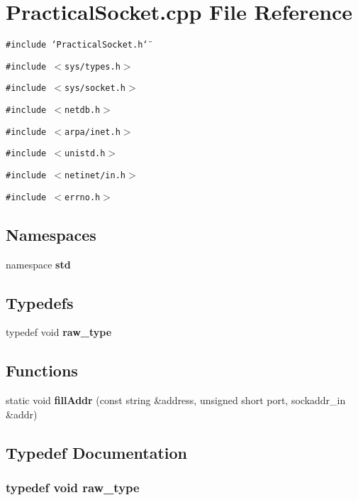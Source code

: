 \section{Practical\-Socket.cpp File Reference}
\label{PracticalSocket_8cpp}
{\tt \#include \char`\"{}Practical\-Socket.h\char`\"{}}\par
{\tt \#include $<$sys/types.h$>$}\par
{\tt \#include $<$sys/socket.h$>$}\par
{\tt \#include $<$netdb.h$>$}\par
{\tt \#include $<$arpa/inet.h$>$}\par
{\tt \#include $<$unistd.h$>$}\par
{\tt \#include $<$netinet/in.h$>$}\par
{\tt \#include $<$errno.h$>$}\par
\subsection*{Namespaces}
\begin{CompactItemize}
\item 
namespace {\bf std}
\end{CompactItemize}
\subsection*{Typedefs}
\begin{CompactItemize}
\item 
typedef void {\bf raw\_\-type}
\end{CompactItemize}
\subsection*{Functions}
\begin{CompactItemize}
\item 
static void {\bf fill\-Addr} (const string \&address, unsigned short port, sockaddr\_\-in \&addr)
\end{CompactItemize}


\subsection{Typedef Documentation}
\subsubsection{\setlength{\rightskip}{0pt plus 5cm}typedef void {\bf raw\_\-type}}\label{PracticalSocket_8cpp_ba7a57aadc5c75eaab8ee698d0fa6608}




